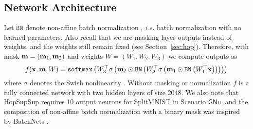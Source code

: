 \documentclass{article}
\newcommand{\ac}{SupSup\xspace}
\newcommand{\casename}[1]{\ensuremath{\mathsf{#1}}\xspace}
\begin{document}
\subsection{Network Architecture}
Let $\texttt{BN}$ denote non-affine batch normalization \cite{ioffe2015batch}, \textit{i.e.} batch normalization with no learned parameters. Also recall that we are masking layer outputs instead of weights, and the weights still remain fixed (see Section~\ref{sec:hop}). Therefore, with mask $\mathbf{m} = (\mathbf{m}_1, \mathbf{m}_2)$ and weights $W = (W_1, W_2, W_3)$ we compute outputs as
\begin{align}
    f(\mathbf{x}, \mathbf{m}, W) = \texttt{softmax}\left(  W_3^\top \sigma\left( \mathbf{m}_2 \odot \texttt{BN}\left(  W_2^\top \sigma\left( \mathbf{m}_1 \odot \texttt{BN}\left( W_1^\top \mathbf{x}  \right) \right)  \right) \right) \right)
\end{align}
where $\sigma$ denotes the Swish nonlinearity \cite{ramachandran2017searching}. Without masking or normalization $f$ is a fully connected network with two hidden layers of size 2048. We also note that Hop\ac requires 10 output neurons for SplitMNIST in Scenario \casename{GNu}, and the composition of non-affine batch normalization with a binary mask was inspired by BatchNets \cite{frankle2020training}. 
\end{document}

